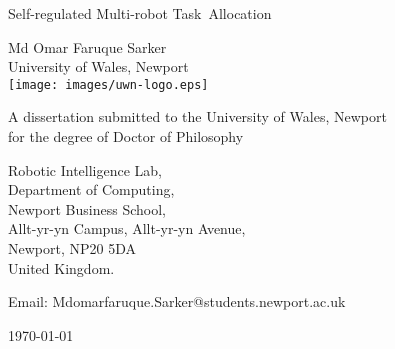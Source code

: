 %
%
%
%

\begin{titlepage}

\begin{center}
\noindent
\huge
Self-regulated Multi-robot Task~Allocation
\end{center}

\begin{center}
\noindent
\huge
Md Omar Faruque Sarker\\[10pt]
\large
University of Wales, Newport\\[16pt]
\texttt{[image: images/uwn-logo.eps]}
\end{center}

\begin{center}
\noindent
\large
A dissertation submitted to the University of Wales, Newport\\
for the degree of Doctor of Philosophy\\
\end{center}

\begin{center}
\noindent
Robotic Intelligence Lab,\\
Department of Computing,\\
Newport Business School,\\
Allt-yr-yn Campus, Allt-yr-yn Avenue, \\
Newport, NP20 5DA\\
United Kingdom.\\
\end{center}

\begin{center}
\noindent
Email: Mdomarfaruque.Sarker@students.newport.ac.uk \\
\end{center}

\begin{center}
\noindent
\today
\end{center}

\end{titlepage}
